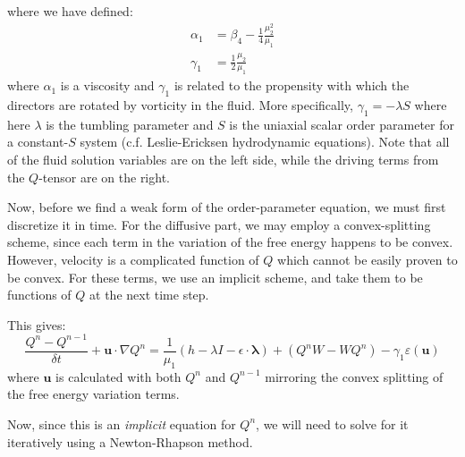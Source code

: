 \documentclass[reqno]{article}
\begin{document}
  where we have defined:
  \begin{align}
    \alpha_1 &= \beta_4 - \frac14 \frac{\mu_2^2}{\mu_1} \\
    \gamma_1 &= \frac12 \frac{\mu_2}{\mu_1}
  \end{align}
  where $\alpha_1$ is a viscosity and $\gamma_1$ is related to the propensity
  with which the directors are rotated by vorticity in the fluid.
  More specifically, $\gamma_1 = -\lambda S$ where here $\lambda$ is the
  tumbling parameter and $S$ is the uniaxial scalar order parameter for a
  constant-$S$ system (c.f. Leslie-Ericksen hydrodynamic equations).
  Note that all of the fluid solution variables are on the left side, while the
  driving terms from the $Q$-tensor are on the right.

  Now, before we find a weak form of the order-parameter equation, we must first
  discretize it in time.
  For the diffusive part, we may employ a convex-splitting scheme, since each
  term in the variation of the free energy happens to be convex.
  However, velocity is a complicated function of $Q$ which cannot be easily
  proven to be convex.
  For these terms, we use an implicit scheme, and take them to be functions of
  $Q$ at the next time step.

  This gives:
  \begin{equation}
    \frac{Q^n - Q^{n - 1}}{\delta t}
    + \mathbf{u} \cdot \nabla Q^n
    =
    \frac{1}{\mu_1} \left( h - \lambda I - \epsilon \cdot \boldsymbol\lambda \right)
    + \left( Q^n W - W Q^n \right)
    - \gamma_1 \varepsilon(\mathbf{u})
  \end{equation}
  where $\mathbf{u}$ is calculated with both $Q^n$ and $Q^{n - 1}$ mirroring the
  convex splitting of the free energy variation terms.

  Now, since this is an \textit{implicit} equation for $Q^n$, we will need to
  solve for it iteratively using a Newton-Rhapson method.
	
\end{document}
